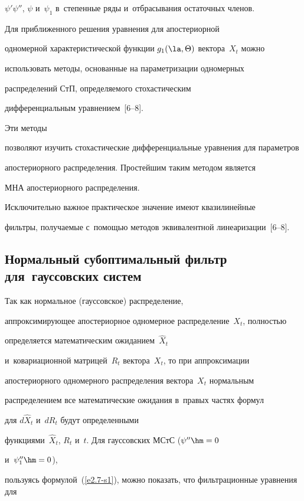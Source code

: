  $\psi'\psi''$, $\psi$ и~$\psi_1$ в~степенные ряды и~отбрасывания остаточных членов.



 Для приближенного решения уравнения  для апостериорной

одномерной характеристической функции  $g_1(\la, \Theta)$ вектора~$X_t$ можно

использовать методы, основанные на параметризации одномерных

 распределений СтП, опре\-де\-ля\-емо\-го стохастическим

 дифференциальным уравнением~[6--8]. %

 Эти методы

 позволяют изучить  стохастические дифференциальные уравнения для па\-ра\-мет\-ров

 апостериорного распределения. Простейшим таким методом является

 МНА апостериорного распределения.

Исключительно важное практическое значение имеют квазилинейные

фильтры, получаемые с~по\-мощью методов эквивалентной линеаризации~[6--8].




\subsection{Нормальный субоптимальный фильтр для~гауссовских систем}



Так как нормальное (гауссовское) распределение, 

аппроксимирующее апостериорное одномерное распределение~$X_t$, полностью 

определяется математическим ожиданием~$\hat X_t$ 

и~ковариационной матрицей~$R_t$ вектора~$X_t$, то при аппроксимации

апостериорного одномерного распределения вектора~$X_t$ нормальным

распределением все математические ожидания в~правых частях формул

для $d\hat X_t$ и~$dR_t$ будут определенными

функциями~$\hat X_t$, $R_t$ и~$t$. Для гауссовских МСтС ($\psi'' \hm=0$

и~$\psi_1''\hm=0$), 

пользуясь формулой~(\ref{e2.7-s1}), можно показать, что фильтрационные уравнения для 

